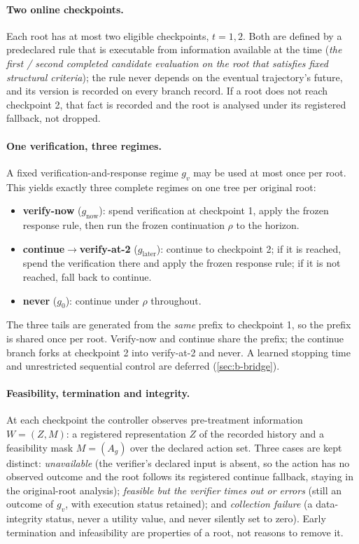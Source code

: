 \paragraph{Two online checkpoints.}
Each root has at most two eligible checkpoints, $t=1,2$.  Both are defined by a
predeclared rule that is executable from information available at the time
(\emph{the first / second completed candidate evaluation on the root that
satisfies fixed structural criteria}); the rule never depends on the eventual
trajectory's future, and its version is recorded on every branch record.  If a
root does not reach checkpoint 2, that fact is recorded and the root is analysed
under its registered fallback, not dropped.

\paragraph{One verification, three regimes.}
A fixed verification-and-response regime $g_v$ may be used at most once per root.
This yields exactly three complete regimes on one tree per original root:
\begin{itemize}[leftmargin=1.4em]
\item \textbf{verify-now} ($g_{\mathrm{now}}$): spend verification at
  checkpoint 1, apply the frozen response rule, then run the frozen continuation
  $\rho$ to the horizon.
\item \textbf{continue$\to$verify-at-2} ($g_{\mathrm{later}}$): continue to
  checkpoint 2; if it is reached, spend the verification there and apply the
  frozen response rule; if it is not reached, fall back to continue.
\item \textbf{never} ($g_0$): continue under $\rho$ throughout.
\end{itemize}
The three tails are generated from the \emph{same} prefix to checkpoint 1, so
the prefix is shared once per root.  Verify-now and continue share the prefix;
the continue branch forks at checkpoint 2 into verify-at-2 and never.  A learned
stopping time and unrestricted sequential control are deferred
(\cref{sec:b-bridge}).

\paragraph{Feasibility, termination and integrity.}
At each checkpoint the controller observes pre-treatment information $W=(Z,M)$:
a registered representation $Z$ of the recorded history and a feasibility mask
$M=(A_g)$ over the declared action set.  Three cases are kept distinct:
\emph{unavailable} (the verifier's declared input is absent, so the action has no
observed outcome and the root follows its registered continue fallback, staying
in the original-root analysis); \emph{feasible but the verifier times out or
errors} (still an outcome of $g_v$, with execution status retained); and
\emph{collection failure} (a data-integrity status, never a utility value, and
never silently set to zero).  Early termination and infeasibility are properties
of a root, not reasons to remove it.

